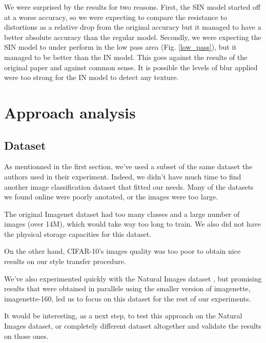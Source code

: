 \documentclass{article}
\begin{document}
We were surprised by the results for two reasons.
First, the SIN model started off at a worse accuracy, so we were expecting to compare the resistance to distortions as a relative drop from the original accuracy but it managed to have a better absolute accuracy than the regular model.
Secondly, we were expecting the SIN model to under perform in the low pass area (Fig. \ref{low_pass}), but it managed to be better than the IN model. 
This goes against the results of the original paper and against common sense. 
It is possible the levels of blur applied were too strong for the IN model to detect any texture.

\section{Approach analysis}

\subsection{Dataset}

As mentionned in the first section, we've used a subset of 
the same dataset the authors used in their experiment. 
Indeed, we didn't have much time to find another image classification dataset that fitted our needs.
Many of the datasets we found online were poorly anotated, or the images
were too large. \medskip \par 

\noindent
The original Imagenet dataset had too many classes and a large number of images (over 14M), 
which would take way too long to train. 
We also did not have the physical storage capacities for this dataset. \medskip \par 

\noindent
On the other hand, CIFAR-10's images quality was too poor 
to obtain nice results on our style transfer procedure. \medskip \par 

\noindent
We've also experimented quickly with the Natural Images dataset \cite{natural-images}, 
but promising results that were obtained in parallele using the smaller version of imagenette, 
imagenette-160, led us to focus on this dataset for the rest of our experiments. \medskip \par 

\noindent
It would be interesting, as a next step, to test this approach on the Natural Images dataset,
or completely different dataset altogether and validate the results on those ones.
\end{document}
